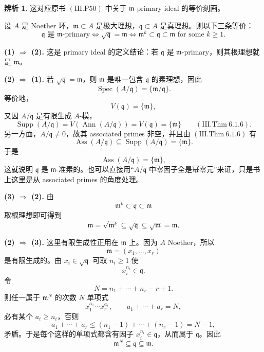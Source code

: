 \documentclass[a4paper]{ctexart}
\theoremstyle{definition}
\theoremstyle{analysis}
\newtheorem{remark}{辨析}[section]
\theoremstyle{plain}
\begin{document}
\label{rem:m-primary}
\begin{remark}
这对应原书 \((\mathrm{III.P50})\) 中关于 \(\mathfrak m\)-primary ideal 的等价刻画。

设 \(A\) 是 Noether 环，\(\mathfrak m\subset A\) 是极大理想，\(\mathfrak q\subset A\) 是真理想。则以下三条等价：
\[
  \mathfrak q\text{ 是 }\mathfrak m\text{-primary}
  \iff
  \sqrt{\mathfrak q}=\mathfrak m
  \iff
  \mathfrak m^k\subset \mathfrak q\subset \mathfrak m
  \text{ for some }k\ge 1.
\]

\textbf{(1) \(\Rightarrow\) (2).} 这是 primary ideal 的定义结论：若 \(\mathfrak q\) 是 \(\mathfrak m\)-primary，则其根理想就是 \(\mathfrak m\)。

\textbf{(2) \(\Rightarrow\) (1).} 若 \(\sqrt{\mathfrak q}=\mathfrak m\)，则 \(\mathfrak m\) 是唯一包含 \(\mathfrak q\) 的素理想，因此
\[
  \operatorname{Spec}(A/\mathfrak q)=\{\mathfrak m/\mathfrak q\}.
\]
等价地，
\[
  V(\mathfrak q)=\{\mathfrak m\},
\]
又因 \(A/\mathfrak q\) 是有限生成 \(A\)-模，
\[
  \operatorname{Supp}(A/\mathfrak q)=V(\operatorname{Ann}(A/\mathfrak q))=V(\mathfrak q)=\{\mathfrak m\}
  \qquad (\mathrm{III.Thm}\ 6.1.6).
\]
另一方面，\(A/\mathfrak q\neq 0\)，故其 associated primes 非空，并且由 \((\mathrm{III.Thm}\ 6.1.6)\) 有
\[
  \operatorname{Ass}(A/\mathfrak q)\subseteq \operatorname{Supp}(A/\mathfrak q)=\{\mathfrak m\}.
\]
于是
\[
  \operatorname{Ass}(A/\mathfrak q)=\{\mathfrak m\},
\]
这就说明 \(\mathfrak q\) 是 \(\mathfrak m\)-准素的。也可以直接用“\(A/\mathfrak q\) 中零因子全是幂零元”来证，只是书上这里是从 associated primes 的角度处理。

\textbf{(3) \(\Rightarrow\) (2).} 由
\[
  \mathfrak m^k\subset \mathfrak q\subset \mathfrak m
\]
取根理想即可得到
\[
  \mathfrak m=\sqrt{\mathfrak m^k}\subseteq \sqrt{\mathfrak q}\subseteq \sqrt{\mathfrak m}=\mathfrak m.
\]

\textbf{(2) \(\Rightarrow\) (3).} 这里有限生成性正用在 \(\mathfrak m\) 上。因为 \(A\) Noether，所以
\[
  \mathfrak m=(x_1,\dots,x_r)
\]
是有限生成的。由 \(x_i\in \sqrt{\mathfrak q}\) 可取 \(n_i\ge 1\) 使
\[
  x_i^{n_i}\in \mathfrak q.
\]
令
\[
  N=n_1+\cdots+n_r-r+1.
\]
则任一属于 \(\mathfrak m^N\) 的次数 \(N\) 单项式
\[
  x_1^{a_1}\cdots x_r^{a_r},\qquad a_1+\cdots+a_r=N,
\]
必有某个 \(a_i\ge n_i\)，否则
\[
  a_1+\cdots+a_r\le (n_1-1)+\cdots +(n_r-1)=N-1,
\]
矛盾。于是每个这样的单项式都含有因子 \(x_i^{n_i}\in \mathfrak q\)，从而属于 \(\mathfrak q\)。因此
\[
  \mathfrak m^N\subseteq \mathfrak q\subseteq \mathfrak m.
\]
\end{remark}
\end{document}
